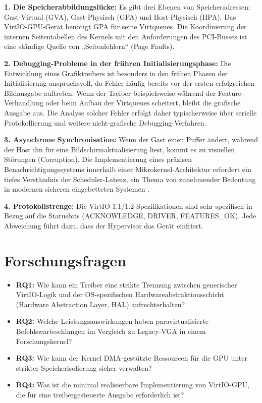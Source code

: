 \textbf{1. Die Speicherabbildungslücke:} Es gibt drei Ebenen von Speicheradressen: Gast-Virtual (GVA), Gast-Physisch (GPA) und Host-Physisch (HPA). Das VirtIO-GPU-Gerät benötigt GPA für seine Virtqueues. Die Koordinierung der internen Seitentabellen des Kernels mit den Anforderungen des PCI-Busses ist eine ständige Quelle von „Seitenfehlern“ (Page Faults).

\textbf{2. Debugging-Probleme in der frühren Initialisierungsphase:} Die Entwicklung eines
Grafiktreibers ist besonders in den frühen Phasen der Initialisierung anspruchsvoll,
da Fehler häufig bereits vor der ersten erfolgreichen Bildausgabe auftreten. Wenn der
Treiber beispielsweise während der Feature-Verhandlung oder beim Aufbau der
Virtqueues scheitert, bleibt die grafische Ausgabe aus. Die Analyse solcher Fehler
erfolgt daher typischerweise über serielle Protokollierung und weitere nicht-grafische
Debugging-Verfahren.

\textbf{3. Asynchrone Synchronisation:} Wenn der Gast einen Puffer ändert, während der Host ihn für eine Bildschirmaktualisierung liest, kommt es zu visuellen Störungen (Corruption). Die Implementierung eines präzisen Benachrichtigungssystems innerhalb einer Mikrokernel-Architektur erfordert ein tiefes Verständnis der Scheduler-Latenz, ein Thema von zunehmender Bedeutung in modernen sicheren eingebetteten Systemen \cite{DeMatos2025}.

\textbf{4. Protokollstrenge:} Die VirtIO 1.1/1.2-Spezifikationen sind sehr spezifisch in Bezug auf die Statusbits (ACKNOWLEDGE, DRIVER, FEATURES\_OK). Jede Abweichung führt dazu, dass der Hypervisor das Gerät einfriert.

\section{Forschungsfragen}
\begin{itemize}[leftmargin=1.5cm]
    \item \textbf{RQ1:} Wie kann ein Treiber eine strikte Trennung zwischen generischer VirtIO-Logik und der OS-spezifischen Hardwareabstraktionsschicht (Hardware Abstraction Layer, HAL) aufrechterhalten?
    \item \textbf{RQ2:} Welche Leistungsauswirkungen haben paravirtualisierte Befehlswarteschlangen im Vergleich zu Legacy-VGA in einem Forschungskernel?
    \item \textbf{RQ3:} Wie kann der Kernel DMA-gestützte Ressourcen für die GPU unter strikter Speicherisolierung sicher verwalten?
    \item \textbf{RQ4:} Was ist die minimal realisierbare Implementierung von VirtIO-GPU, die für eine treibergesteuerte Ausgabe erforderlich ist?
\end{itemize}

